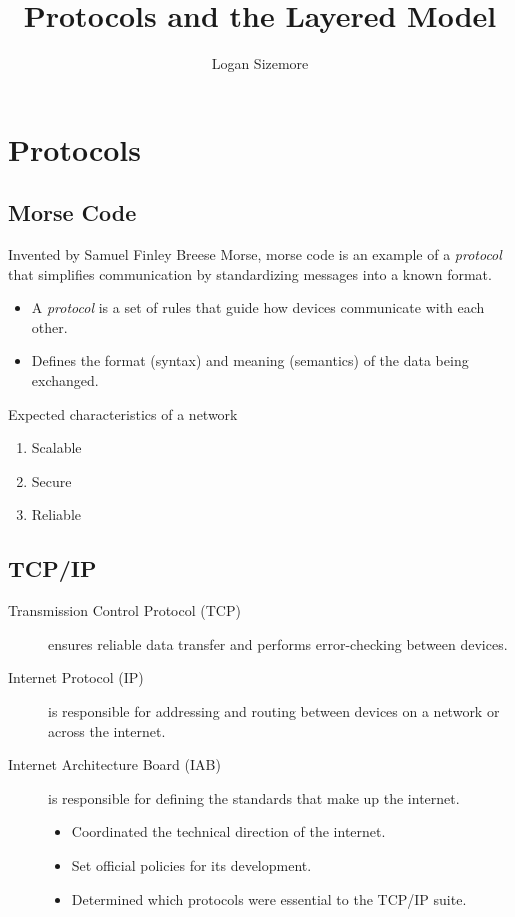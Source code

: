 \documentclass{article}
\title{Protocols and the Layered Model}
\author{Logan Sizemore}
\begin{document}
\maketitle

\section{Protocols}
\subsection{Morse Code}
Invented by Samuel Finley Breese Morse, morse code is an example of a
\emph{protocol} that simplifies communication by standardizing messages into a
known format.

\begin{itemize}
    \item A \emph{protocol} is a set of rules that guide how devices communicate with each
          other.
    \item Defines the format (syntax) and meaning (semantics) of the data being exchanged.
\end{itemize}

\noindent
Expected characteristics of a network
\begin{enumerate}
    \setlength{\itemsep}{0em}
    \item Scalable
    \item Secure
    \item Reliable
\end{enumerate}

\subsection{TCP/IP}
\begin{description}
    \item[Transmission Control Protocol (TCP)] ensures reliable data transfer
          and performs error-checking between devices.
    \item[Internet Protocol (IP)] is responsible for addressing and routing
          between devices on a network or across the internet.
    \item[Internet Architecture Board (IAB)] is responsible for defining the
          standards that make up the internet.
          \begin{itemize}
              \item Coordinated the technical direction of the internet.
              \item Set official policies for its development.
              \item Determined which protocols were essential to the TCP/IP suite.
          \end{itemize}
\end{description}
\end{document}
